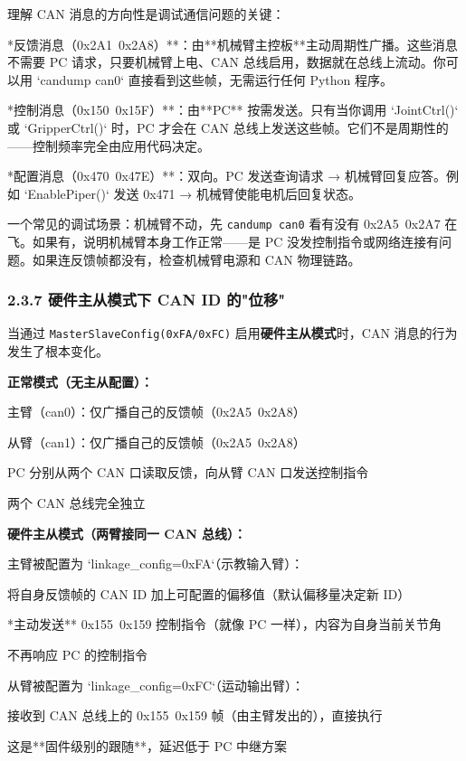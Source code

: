 \documentclass[UTF8,a4paper,11pt]{ctexart}
\begin{document}
理解 CAN 消息的方向性是调试通信问题的关键：

\item **反馈消息（0x2A1~0x2A8）**：由**机械臂主控板**主动周期性广播。这些消息不需要 PC 请求，只要机械臂上电、CAN 总线启用，数据就在总线上流动。你可以用 `candump can0` 直接看到这些帧，无需运行任何 Python 程序。

\item **控制消息（0x150~0x15F）**：由**PC** 按需发送。只有当你调用 `JointCtrl()` 或 `GripperCtrl()` 时，PC 才会在 CAN 总线上发送这些帧。它们不是周期性的——控制频率完全由应用代码决定。

\item **配置消息（0x470~0x47E）**：双向。PC 发送查询请求 → 机械臂回复应答。例如 `EnablePiper()` 发送 0x471 → 机械臂使能电机后回复状态。

一个常见的调试场景：机械臂不动，先 \texttt{candump can0} 看有没有 0x2A5~0x2A7 在飞。如果有，说明机械臂本身工作正常——是 PC 没发控制指令或网络连接有问题。如果连反馈帧都没有，检查机械臂电源和 CAN 物理链路。

\subsubsection{2.3.7 硬件主从模式下 CAN ID 的"位移"}

当通过 \texttt{MasterSlaveConfig(0xFA/0xFC)} 启用\textbf{硬件主从模式}时，CAN 消息的行为发生了根本变化。

\textbf{正常模式（无主从配置）：}
\item 主臂（can0）：仅广播自己的反馈帧（0x2A5~0x2A8）
\item 从臂（can1）：仅广播自己的反馈帧（0x2A5~0x2A8）
\item PC 分别从两个 CAN 口读取反馈，向从臂 CAN 口发送控制指令
\item 两个 CAN 总线完全独立

\textbf{硬件主从模式（两臂接同一 CAN 总线）：}
\item 主臂被配置为 `linkage_config=0xFA`（示教输入臂）：
\item 将自身反馈帧的 CAN ID 加上可配置的偏移值（默认偏移量决定新 ID）
\item **主动发送** 0x155~0x159 控制指令（就像 PC 一样），内容为自身当前关节角
\item 不再响应 PC 的控制指令
\item 从臂被配置为 `linkage_config=0xFC`（运动输出臂）：
\item 接收到 CAN 总线上的 0x155~0x159 帧（由主臂发出的），直接执行
\item 这是**固件级别的跟随**，延迟低于 PC 中继方案
\end{document}

